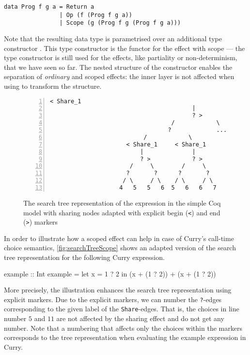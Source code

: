 \begin{verbatim}
data Prog f g a = Return a
                | Op (f (Prog f g a))
                | Scope (g (Prog f g (Prog f g a)))
\end{verbatim}

Note that the resulting data type  is parametrised over an additional type constructor .
This type constructor is the functor for the effect with scope --- the type constructor  is still used for the effects, like partiality or non\--determinism, that we have seen so far.
The nested structure of the  constructor enables the separation of \emph{ordinary} and scoped effects: the inner  layer is not affected when using \hinl{(>>=)} to transform the structure.

\begin{figure}[tb]
 \centering
\begin{Verbatim}[numbers=left, xleftmargin=5mm]
                                     < Share_1
                                         |
                                         ? >
                                   /            \
                                  ?             ...
                           /            \
                      < Share_1     < Share_1
                          |              |
                          ? >            ? >
                       /     \        /     \
                      ?       ?      ?       ?
                     / \     / \    / \     / \
                    4   5   5   6  5   6   6   7
\end{Verbatim}
\caption{The search tree representation of the expression  in the simple Coq model with sharing nodes adapted with explicit begin (\texttt{<}) and end (\texttt{>}) markers}
\label{fig:searchTreeScope}
\end{figure}

In order to illustrate how a scoped effect can help in case of Curry's call\--time choice semantics, \autoref{fig:searchTreeScope} shows an adapted version of the search tree representation for the following Curry expression.

\begin{curry}
example :: Int
example = let x = 1 ? 2 in (x + (1 ? 2)) + (x + (1 ? 2))  
\end{curry}

More precisely, the illustration enhances the search tree representation using explicit markers.
Due to the explicit markers, we can number the \texttt{?}\--edges corresponding to the given label of the \texttt{Share}\--edges.
That is, the choices in line number $5$ and $11$ are not affected by the sharing effect and do not get any number.
Note that a numbering that affects only the choices within the markers corresponds to the tree representation when evaluating the example expression in Curry.

